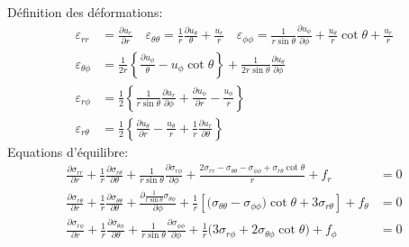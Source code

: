 Définition des déformations:
\begin{align*}
    \varepsilon_{rr} &= \frac{\partial u_r}{\partial r} \quad \varepsilon_{\theta\theta} = \frac{1}{r} \frac{\partial u_{\theta}}{\theta} + \frac{u_r}{r} \quad \varepsilon_{\phi\phi} = \frac{1}{r \sin \theta} \frac{\partial u_{\phi}}{\partial \phi} + \frac{u_{\theta}}{r}\cot \theta + \frac{u_r}{r} \\[3pt]
    \varepsilon_{\theta \phi} &= \frac{1}{2r} \left\{ \frac{\partial u_{\phi}}{\theta} - u_{\phi} \cot \theta \right\} + \frac{1}{2r\sin \theta} \frac{\partial u_{\theta}}{\partial \phi} \\[3pt]
    \varepsilon_{r\phi} &= \frac{1}{2} \left\{ \frac{1}{r \sin \theta} \frac{\partial u_r}{\partial \phi} + \frac{\partial u_\phi}{\partial r} - \frac{u_{\phi}}{r}\right\} \\[3pt]
    \varepsilon_{r\theta} &= \frac{1}{2} \left\{ \frac{\partial u_{\theta}}{\partial r} - \frac{u_{\theta}}{r} + \frac{1}{r} \frac{\partial u_r}{\partial \theta} \right\}
\end{align*}
Equations d'équilibre:
\begin{align*}
    \frac{\partial \sigma_{rr}}{\partial r} + \frac{1}{r} \frac{\partial \sigma_{r\theta}}{\partial \theta} + \frac{1}{r \sin \theta} \frac{\partial \sigma_{r\phi}}{\partial \phi} + \frac{2 \sigma_{rr} - \sigma_{\theta\theta} -\sigma_{\phi\phi} +\sigma_{r\theta} \cot \theta}{r} + f_r &=0\\[3pt]
    \frac{\partial \sigma_{r\theta}}{\partial r} + \frac{1}{r} \frac{\partial \sigma_{\theta\theta}}{\partial \theta} + \frac{\partial \frac{1}{r \sin \theta} \sigma_{\theta \phi}}{\partial \phi} + \frac{1}{r} \left[ \bigl( \sigma_{\theta\theta} -\sigma_{\phi\phi} \bigr)\cot\theta +3\sigma_{r\theta} \right]+ f_{\theta} &=0\\[3pt]
    \frac{\partial \sigma_{r\phi}}{\partial r} + \frac{1}{r} \frac{\partial \sigma_{\theta \phi}}{\partial \theta} + \frac{1}{r \sin \theta} \frac{\partial \sigma_{\phi\phi}}{\partial \phi} + \frac{1}{r}\bigl( 3\sigma_{r\phi} + 2 \sigma_{\theta\phi}\cot \theta \bigr) + f_\phi &=0
\end{align*}
